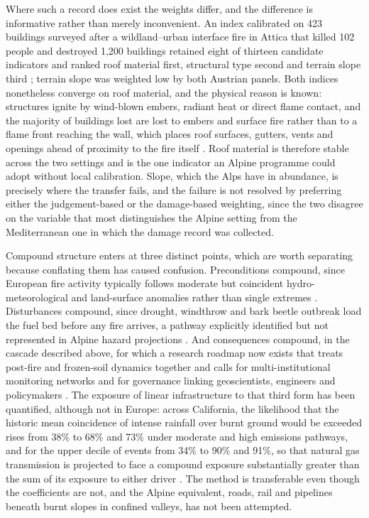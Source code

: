 \documentclass[11pt,a4paper]{article}
\begin{document}
Where such a record does exist the weights differ, and the difference is informative rather than merely inconvenient. An index calibrated on 423 buildings surveyed after a wildland--urban interface fire in Attica that killed 102 people and destroyed 1{,}200 buildings retained eight of thirteen candidate indicators and ranked roof material first, structural type second and terrain slope third \citep{papathomakohle_wildfire_2022}; terrain slope was weighted low by both Austrian panels. Both indices nonetheless converge on roof material, and the physical reason is known: structures ignite by wind-blown embers, radiant heat or direct flame contact, and the majority of buildings lost are lost to embers and surface fire rather than to a flame front reaching the wall, which places roof surfaces, gutters, vents and openings ahead of proximity to the fire itself \citep{naser_vulnerability_2025}. Roof material is therefore stable across the two settings and is the one indicator an Alpine programme could adopt without local calibration. Slope, which the Alps have in abundance, is precisely where the transfer fails, and the failure is not resolved by preferring either the judgement-based or the damage-based weighting, since the two disagree on the variable that most distinguishes the Alpine setting from the Mediterranean one in which the damage record was collected.

Compound structure enters at three distinct points, which are worth separating because conflating them has caused confusion. Preconditions compound, since European fire activity typically follows moderate but coincident hydro-meteorological and land-surface anomalies rather than single extremes \citep{miller_compounding_2025}. Disturbances compound, since drought, windthrow and bark beetle outbreak load the fuel bed before any fire arrives, a pathway explicitly identified but not represented in Alpine hazard projections \citep{gerberding_mapping_2025, bebi_changes_2017}. And consequences compound, in the cascade described above, for which a research roadmap now exists that treats post-fire and frozen-soil dynamics together and calls for multi-institutional monitoring networks and for governance linking geoscientists, engineers and policymakers \citep{baselt_compound_2026}. The exposure of linear infrastructure to that third form has been quantified, although not in Europe: across California, the likelihood that the historic mean coincidence of intense rainfall over burnt ground would be exceeded rises from 38\% to 68\% and 73\% under moderate and high emissions pathways, and for the upper decile of events from 34\% to 90\% and 91\%, so that natural gas transmission is projected to face a compound exposure substantially greater than the sum of its exposure to either driver \citep{moftakhari_increasing_2019}. The method is transferable even though the coefficients are not, and the Alpine equivalent, roads, rail and pipelines beneath burnt slopes in confined valleys, has not been attempted.
\end{document}
